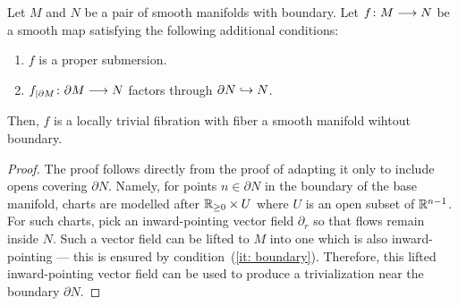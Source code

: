 \documentclass{amsbook}
\begin{document}
\begin{proposition}\label{ap:: prop: ehresmann boundary}
    Let $M$ and $N$ be a pair of smooth manifolds with boundary. Let $f\colon M \longrightarrow N$ be a smooth map satisfying the following additional conditions:
    \begin{enumerate}
        \item \label{it: prop sub} $f$ is a proper submersion.
        \item \label{it: boundary} $f_{|\partial M} \colon \partial M \longrightarrow N$ factors through $\partial N \hookrightarrow N$.
    \end{enumerate}
    Then, $f$ is a locally trivial fibration with fiber a smooth manifold wihtout boundary.
\end{proposition}
\begin{proof}
    The proof follows directly from the proof of  adapting it only to include opens covering $\partial N$. Namely, for points $n \in \partial N$ in the boundary of the base manifold, charts are modelled after $\mathbb R_{\geq 0} \times U$ where $U$ is an open subset of $\mathbb R^{n-1}$. For such charts, pick an inward-pointing vector field $\partial_r$ so that flows remain inside $N$. Such a vector field can be lifted to $M$ into one which is also inward-pointing — this is ensured by condition~(\ref{it: boundary}). Therefore, this lifted inward-pointing vector field can be used to produce a trivialization near the boundary $\partial N$.
\end{proof}

\fi

\printbibliography
\end{document}
